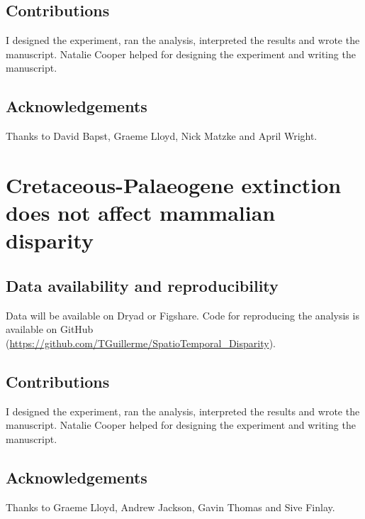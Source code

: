 \subsection*{Contributions}
I designed the experiment, ran the analysis, interpreted the results and wrote the manuscript. Natalie Cooper helped for designing the experiment and writing the manuscript.
\subsection*{Acknowledgements}
Thanks to David Bapst, Graeme Lloyd, Nick Matzke and April Wright.

\section*{Cretaceous-Palaeogene extinction does not affect mammalian disparity}
\subsection*{Data availability and reproducibility}
Data will be available on Dryad or Figshare.
Code for reproducing the analysis is available on GitHub (\url{https://github.com/TGuillerme/SpatioTemporal_Disparity}).
\subsection*{Contributions}
I designed the experiment, ran the analysis, interpreted the results and wrote the manuscript. Natalie Cooper helped for designing the experiment and writing the manuscript.
\subsection*{Acknowledgements}
Thanks to Graeme Lloyd, Andrew Jackson, Gavin Thomas and Sive Finlay.